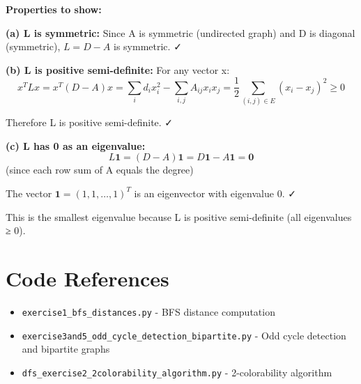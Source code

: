 \documentclass[12pt,a4paper]{article}
\begin{document}
\textbf{Properties to show:}

\textbf{(a) L is symmetric:}
Since A is symmetric (undirected graph) and D is diagonal (symmetric), $L = D - A$ is symmetric. ✓

\textbf{(b) L is positive semi-definite:}
For any vector x:
$$x^TLx = x^T(D-A)x = \sum_i d_i x_i^2 - \sum_{i,j} A_{ij} x_i x_j = \frac{1}{2}\sum_{(i,j) \in E} (x_i - x_j)^2 \geq 0$$

Therefore L is positive semi-definite. ✓

\textbf{(c) L has 0 as an eigenvalue:}
$$L\mathbf{1} = (D-A)\mathbf{1} = D\mathbf{1} - A\mathbf{1} = \mathbf{0}$$ (since each row sum of A equals the degree)

The vector $\mathbf{1} = (1,1,\ldots,1)^T$ is an eigenvector with eigenvalue 0. ✓

This is the smallest eigenvalue because L is positive semi-definite (all eigenvalues ≥ 0).

\section{Code References}

\begin{itemize}
    \item \texttt{exercise1\_bfs\_distances.py} - BFS distance computation
    \item \texttt{exercise3and5\_odd\_cycle\_detection\_bipartite.py} - Odd cycle detection and bipartite graphs
    \item \texttt{dfs\_exercise2\_2colorability\_algorithm.py} - 2-colorability algorithm
\end{itemize}
\end{document}
